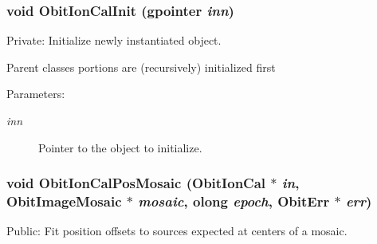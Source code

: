 \subsubsection{\setlength{\rightskip}{0pt plus 5cm}void Obit\-Ion\-Cal\-Init (gpointer {\em inn})}\label{ObitIonCal_8c_a14}


Private: Initialize newly instantiated object. 

Parent classes portions are (recursively) initialized first \begin{Desc}
\item[Parameters:]
\begin{description}
\item[{\em inn}]Pointer to the object to initialize. \end{description}
\end{Desc}
\subsubsection{\setlength{\rightskip}{0pt plus 5cm}void Obit\-Ion\-Cal\-Pos\-Mosaic ({\bf Obit\-Ion\-Cal} $\ast$ {\em in}, {\bf Obit\-Image\-Mosaic} $\ast$ {\em mosaic}, {\bf olong} {\em epoch}, {\bf Obit\-Err} $\ast$ {\em err})}\label{ObitIonCal_8c_a50}


Public: Fit position offsets to sources expected at centers of a mosaic. 

